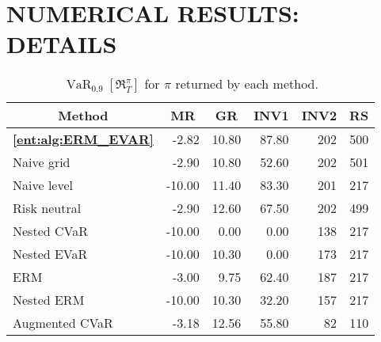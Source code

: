 \documentclass[twoside]{article}
\newcommand{\var}[2]{\operatorname{VaR}_{#1} \left[#2\right]}
\theoremstyle{plain}
\theoremstyle{definition}
\theoremstyle{remark}
\begin{document}
\newpage 
\section{NUMERICAL RESULTS: DETAILS}
\label{ent:sec:experiments-detail}

\begin{table}
    \caption{$\var{0.9}{\mathfrak{R}^{\pi}_{T}}$ for $\pi$ returned by each method.} \label{ent:tab:var_09}
    \centering
    \begin{tabular}{l|rrrrr}
      \toprule
    \multicolumn{1}{c|}{Method} & \multicolumn{1}{c}{MR} & \multicolumn{1}{c}{GR} &  \multicolumn{1}{c}{INV1} & \multicolumn{1}{c}{INV2} & \multicolumn{1}{c}{RS}  \\
      \midrule
      \textbf{\cref{ent:alg:ERM_EVAR}}  & -2.82 & 10.80 & 87.80 & 202 & 500 \\ 
      Naive grid & -2.90 & 10.80 & 52.60 & 202 & 501 \\ 
      Naive level & -10.00 & 11.40 & 83.30 & 201 & 217 \\ 
      \midrule
      Risk neutral & -2.90 & 12.60 & 67.50 & 202 & 499 \\ 
      Nested CVaR & -10.00 & 0.00 & 0.00 & 138 & 217 \\ 
      Nested EVaR & -10.00 & 10.30 & 0.00 & 173 & 217 \\ 
      ERM & -3.00 & 9.75 & 62.40 & 187 & 217 \\ 
      Nested ERM & -10.00 & 10.30 & 32.20 & 157 & 217 \\ 
      \midrule
      Augmented CVaR & -3.18 & 12.56 & 55.80 & 82 & 110 \\
      \bottomrule
    \end{tabular}
\end{table}
\end{document}
